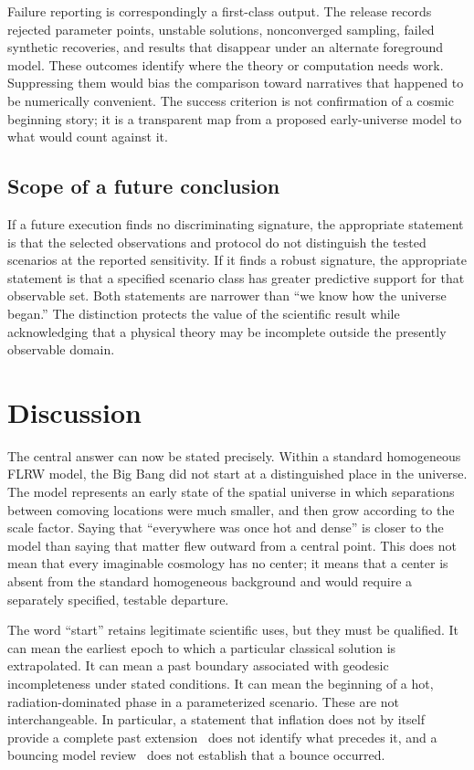 \documentclass[10pt,conference]{IEEEtran}
\begin{document}
Failure reporting is correspondingly a first-class output. The release records rejected parameter points, unstable solutions, nonconverged sampling, failed synthetic recoveries, and results that disappear under an alternate foreground model. These outcomes identify where the theory or computation needs work. Suppressing them would bias the comparison toward narratives that happened to be numerically convenient. The success criterion is not confirmation of a cosmic beginning story; it is a transparent map from a proposed early-universe model to what would count against it.

\subsection{Scope of a future conclusion}

If a future execution finds no discriminating signature, the appropriate statement is that the selected observations and protocol do not distinguish the tested scenarios at the reported sensitivity. If it finds a robust signature, the appropriate statement is that a specified scenario class has greater predictive support for that observable set. Both statements are narrower than ``we know how the universe began.'' The distinction protects the value of the scientific result while acknowledging that a physical theory may be incomplete outside the presently observable domain.

\section{Discussion}
\label{sec:discussion}

The central answer can now be stated precisely. Within a standard homogeneous FLRW model, the Big Bang did not start at a distinguished place in the universe. The model represents an early state of the spatial universe in which separations between comoving locations were much smaller, and then grow according to the scale factor. Saying that ``everywhere was once hot and dense'' is closer to the model than saying that matter flew outward from a central point. This does not mean that every imaginable cosmology has no center; it means that a center is absent from the standard homogeneous background and would require a separately specified, testable departure.

The word ``start'' retains legitimate scientific uses, but they must be qualified. It can mean the earliest epoch to which a particular classical solution is extrapolated. It can mean a past boundary associated with geodesic incompleteness under stated conditions. It can mean the beginning of a hot, radiation-dominated phase in a parameterized scenario. These are not interchangeable. In particular, a statement that inflation does not by itself provide a complete past extension~\cite{bgv2003} does not identify what precedes it, and a bouncing model review~\cite{brandenberger2017} does not establish that a bounce occurred.
\end{document}
